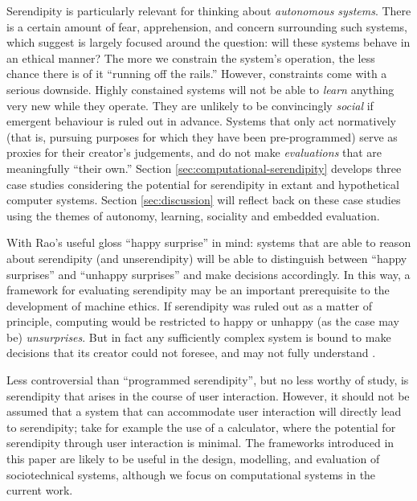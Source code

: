 Serendipity is particularly relevant for thinking about
\emph{autonomous systems}.  There is a certain amount of fear,
apprehension, and concern surrounding such systems, which
 suggest is largely focused around the
question: will these systems behave in an ethical manner?  The more we
constrain the system's operation, the less chance there is of it ``running off
the rails.''  However, constraints come with a serious downside.
Highly constained systems will not be able to \emph{learn} anything
very new while they operate.  They are unlikely to be convincingly
\emph{social} if emergent behaviour is ruled out in advance.  Systems
that only act normatively (that is, pursuing purposes for which they have
been pre-programmed) serve as proxies for their creator's
judgements, and do not make \emph{evaluations} that are meaningfully
``their own.''  Section \ref{sec:computational-serendipity} develops
three case studies considering the potential for serendipity in extant
and hypothetical computer systems.  Section
\ref{sec:discussion} will reflect back on these case studies 
using the themes of autonomy, learning, sociality and embedded evaluation.

With Rao's \citeyearpar{rao2015breaking} useful gloss ``happy
surprise'' in mind: systems that are able to reason about serendipity
(and unserendipity) will be able to distinguish between ``happy
surprises'' and ``unhappy surprises'' and make decisions accordingly.
In this way, a framework for evaluating serendipity may be an
important prerequisite to the development of machine ethics.  If
serendipity was ruled out as a matter of principle, computing would be
restricted to happy or unhappy (as the case may be)
\emph{unsurprises}.  But in fact any sufficiently complex system is
bound to make decisions that its creator could not foresee, and may
not fully understand \cite{minsky1967programming}.

Less controversial than ``programmed serendipity'', but no less worthy
of study, is serendipity that arises in the course of user
interaction.  However, it should not be assumed that a system that can
accommodate user interaction will directly lead to serendipity; take
for example the use of a calculator, where the potential for
serendipity through user interaction is minimal.  The frameworks
introduced in this paper are likely to be useful in the design,
modelling, and evaluation of sociotechnical systems, although we focus
on computational systems in the current work.

